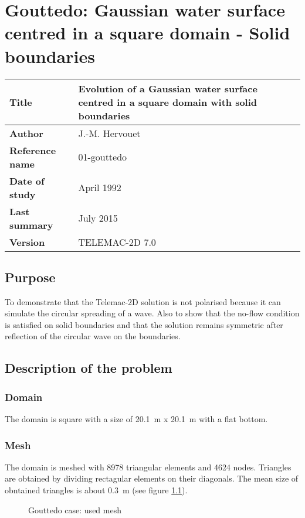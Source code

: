 \chapter{Gouttedo: Gaussian water surface centred in a square domain - Solid boundaries}
%
\begin{tabular}{|p{1.5in}|p{2.5in}|} \hline
\textbf{Title} & Evolution of a Gaussian water surface centred in a square domain with solid boundaries \\ \hline
\textbf{Author} & J.-M. Hervouet \\ \hline
\textbf{Reference name} & 01-gouttedo \\ \hline
\textbf{Date of study} & April 1992 \\ \hline
\textbf{Last summary} & July 2015 \\ \hline
\textbf{Version} & TELEMAC-2D 7.0 \\ \hline
\end{tabular}


%
\section{Purpose}
%
To demonstrate that the Telemac-2D solution is not polarised because it can
simulate the circular spreading of a wave. Also to show that the no-flow
condition is satisfied on solid boundaries and that the solution remains
symmetric after reflection of the circular wave on the boundaries.

%
\section{Description of the problem}
%
\subsection{Domain}
The domain is square with a size of  20.1~m x 20.1~m with a flat bottom.
\subsection{Mesh}
The domain is meshed with 8978 triangular elements and 4624 nodes. Triangles
are obtained by dividing rectagular elements on their diagonals. The mean size
of obntained triangles is about 0.3~m (see figure \ref{fig:gouttedo_mesh}).
\begin{figure}[h]
\begin{center}
\end{center}
\caption{Gouttedo case: used mesh}
\label{fig:gouttedo_mesh}
\end{figure}

